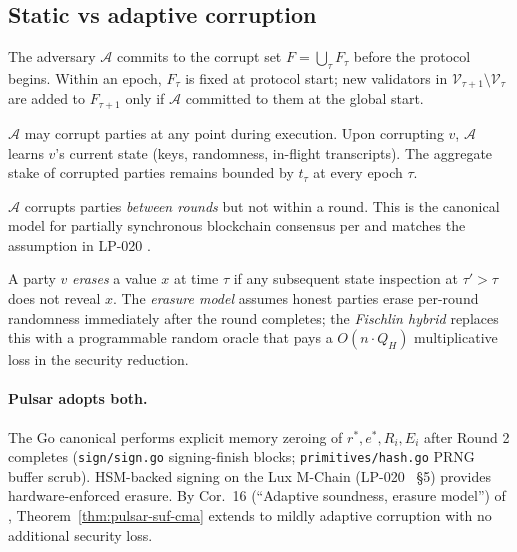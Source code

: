 \subsection{Static vs adaptive corruption}
\label{sec:formal-model:static-adaptive}

\begin{definition}
The adversary $\mathcal{A}$ commits to the corrupt set
$F = \bigcup_\tau F_\tau$ before the protocol begins. Within an epoch,
$F_\tau$ is fixed at protocol start; new validators in
$\mathcal{V}_{\tau+1} \setminus \mathcal{V}_\tau$ are added to
$F_{\tau+1}$ only if $\mathcal{A}$ committed to them at the global
start.
\end{definition}

\begin{definition}
$\mathcal{A}$ may corrupt parties at any point during execution.
Upon corrupting $v$, $\mathcal{A}$ learns $v$'s current state (keys,
randomness, in-flight transcripts). The aggregate stake of corrupted
parties remains bounded by $t_\tau$ at every epoch $\tau$.
\end{definition}

\begin{definition}
\label{def:mildly-adaptive}
$\mathcal{A}$ corrupts parties \emph{between rounds} but not within a
round. This is the canonical model for partially synchronous
blockchain consensus per \cite{garaybackbone} and matches the
assumption in LP-020 \cite{lp020}.
\end{definition}

\begin{definition}
\label{def:erasure}
A party $v$ \emph{erases} a value $x$ at time $\tau$ if any subsequent
state inspection at $\tau' > \tau$ does not reveal $x$. The
\emph{erasure model} assumes honest parties erase per-round
randomness immediately after the round completes; the
\emph{Fischlin hybrid} \cite{fischlin2005} replaces this with a
programmable random oracle that pays a $O(n \cdot Q_H)$ multiplicative
loss in the security reduction.
\end{definition}

\paragraph{Pulsar adopts both.} The Go canonical performs explicit
memory zeroing of $r^*, e^*, R_i, E_i$ after Round 2 completes
(\texttt{sign/sign.go} signing-finish blocks; \texttt{primitives/hash.go}
PRNG buffer scrub). HSM-backed signing on the Lux M-Chain (LP-020
\cite{lp020}~\S5) provides hardware-enforced erasure. By
Cor.~16 (``Adaptive soundness, erasure model'') of
\cite{quasarcertsoundness}, Theorem~\ref{thm:pulsar-suf-cma} extends to
mildly
adaptive corruption with no additional security loss.


